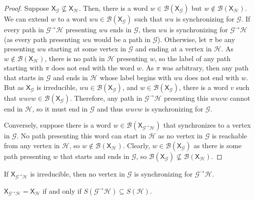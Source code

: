 \documentclass[hidelinks]{report}
\newcommand{\Gc}{\mathcal{G}}  %
\newcommand{\Hc}{\mathcal{H}}  %
\newcommand{\Bc}{\mathcal{B}}
\newcommand{\GtH}{{\Gc^\to\Hc}}
\newcommand{\shift}[1]{\mathsf{X}_{#1}}
\theoremstyle{definition}
\begin{document}
\begin{proof}
    Suppose \(\shift{\Gc} \nsubseteq \shift{\Hc}\). Then, there is a word \(w \in \Bc(\shift{\Gc})\) 
    but \(w \notin \Bc(\shift{\Hc})\). We can extend \(w\) to a word \(wu \in \Bc(\shift{\Gc})\) such 
    that \(wu\) is synchronizing for \(\Gc\). 
    If every path in \(\GtH\) presenting \(wu\) ends in \(\Gc\), then 
    \(wu\) is synchronizing for \(\GtH\) (as every path presenting \(wu\) would be a path in \(\Gc\)).
    Otherwise, let \(\pi\) be any 
    presenting \(wu\) starting at some vertex in \(\Gc\) and ending
    at a vertex in \(\Hc\). As \(w \notin \Bc(\shift{\Hc})\), 
    there is no path in \(\Hc\) presenting \(w\), so the label of any 
    path starting with \(\pi\) does not end with the word \(w\). As \(\pi\)
    was arbitrary, then
    any path that starts in \(\Gc\) and ends in \(\Hc\) whose label 
    begins with \(wu\) does not end with \(w\). But as 
    \(\shift{\Gc}\) is irreducible, \(wu \in \Bc(\shift{\Gc})\), 
    and \(w \in \Bc(\shift{\Gc})\), there is a word \(v\) such that 
    \(wuvw \in \Bc(\shift{\Gc})\). Therefore, any path in \(\GtH\) presenting 
    this \(wuvw\) cannot end in \(\Hc\), so it must end in \(\Gc\)
    and thus \(wuvw\) is synchronizing for \(\Gc\).

    Conversely, suppose there is a word \(w \in \Bc(\shift{\GtH})\) that synchronizes to a vertex in \(\Gc\).
    No path presenting this word can start in \(\Hc\) as no vertex in \(\Gc\) is reachable from any 
    vertex in \(\Hc\), so \(w \notin \Bc(\shift{\Hc})\). Clearly, \(w \in \Bc(\shift{\Gc})\) 
    as there is some path presenting \(w\) that starts and ends in \(\Gc\), so 
    \(\Bc(\shift{\Gc}) \nsubseteq \Bc(\shift{\Hc})\).
\end{proof}

\begin{corollary}\label{nogsync}
    If \(\shift{\GtH}\) is irreducible, then no vertex in \(\Gc\) is synchronizing for \(\GtH\).
\end{corollary}

\begin{theorem}
    \(\shift{\GtH} = \shift{\Hc}\) if and only if \(S(\GtH) \subseteq S(\Hc)\).
\end{theorem}
\end{document}
